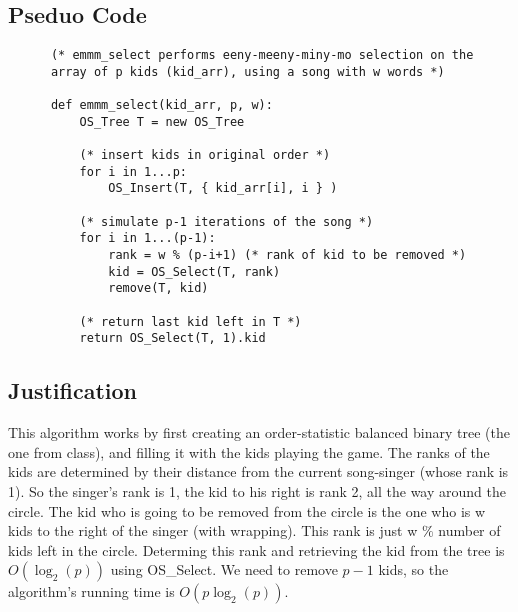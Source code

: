 \documentclass[a4paper,12pt]{article}
\begin{document}
\begin{enumerate}[a)]
\pagebreak

\subsection*{Pseduo Code}

    \begin{verbatim}
      (* emmm_select performs eeny-meeny-miny-mo selection on the 
      array of p kids (kid_arr), using a song with w words *)

      def emmm_select(kid_arr, p, w):
          OS_Tree T = new OS_Tree
          
          (* insert kids in original order *)
          for i in 1...p:
              OS_Insert(T, { kid_arr[i], i } )

          (* simulate p-1 iterations of the song *)
          for i in 1...(p-1):
              rank = w % (p-i+1) (* rank of kid to be removed *)
              kid = OS_Select(T, rank)
              remove(T, kid)

          (* return last kid left in T *)
          return OS_Select(T, 1).kid

    \end{verbatim}

\subsection*{Justification}

This algorithm works by first creating an order-statistic balanced
binary tree (the one from class), and filling it with the kids playing
the game. The ranks of the kids are determined by their distance from
the current song-singer (whose rank is 1). So the singer's rank is 1,
the kid to his right is rank 2, all the way around the circle. The kid
who is going to be removed from the circle is the one who is w kids to
the right of the singer (with wrapping). This rank is just w \(\%\) number
of kids left in the circle. Determing this rank and retrieving the kid
from the tree is \(O(\log_2(p))\) using OS\_Select. We need to remove
\(p-1\) kids, so the algorithm's running time is \(O(p\log_2(p))\).
     
    


    
\end{enumerate}
\end{document}
